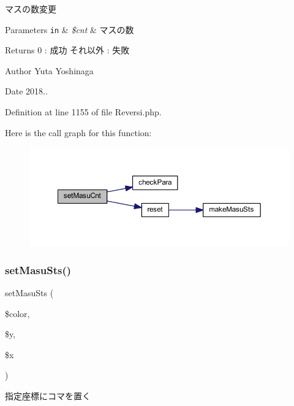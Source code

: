 マスの数変更 


\begin{DoxyParams}[1]{Parameters}
\mbox{\tt in}  & {\em \$cnt} & マスの数 \\
\hline
\end{DoxyParams}
\begin{DoxyReturn}{Returns}
0 \+: 成功 それ以外 \+: 失敗 
\end{DoxyReturn}
\begin{DoxyAuthor}{Author}
Yuta Yoshinaga 
\end{DoxyAuthor}
\begin{DoxyDate}{Date}
2018.. 
\end{DoxyDate}


Definition at line 1155 of file Reversi.\+php.

Here is the call graph for this function\+:
\nopagebreak
\begin{figure}[H]
\begin{center}
\leavevmode
\includegraphics[width=350pt]{class_reversi_ab6853cc0f53e50a70d576f15296f0864_cgraph}
\end{center}
\end{figure}
\mbox{\label{class_reversi_a26f3168c7d94e70d344841d65885a4ac}} 
\subsubsection{\texorpdfstring{set\+Masu\+Sts()}{setMasuSts()}}
{\footnotesize\ttfamily set\+Masu\+Sts (\begin{DoxyParamCaption}\item[{}]{\$color,  }\item[{}]{\$y,  }\item[{}]{\$x }\end{DoxyParamCaption})}



指定座標にコマを置く 


